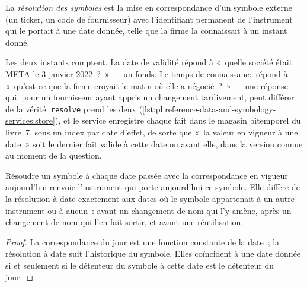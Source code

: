 \begin{definition}\label{def:pl:reference-data-and-symbology-services:resolution}
La \emph{résolution des symboles} est la mise en correspondance d'un symbole externe (un ticker, un code de fournisseur) avec l'identifiant
permanent de l'instrument qui le portait à une date donnée, telle que la firme la connaissait à un instant donné.
\end{definition}

Les deux instants comptent. La date de validité répond à «~quelle société était META le 3 janvier 2022~?~» --- un fonds. Le temps de connaissance répond à
«~qu'est-ce que la firme croyait le matin où elle a négocié~?~» --- une réponse qui, pour un fournisseur ayant appris un changement tardivement, peut différer de la
vérité. \texttt{resolve} prend les deux (\cref{lst:pl:reference-data-and-symbology-services:store}), et le service enregistre chaque fait
dans le magasin bitemporel du livre~7, sous un index par date d'effet, de sorte que «~la valeur en vigueur à une date~» soit le dernier fait valide
à cette date ou avant elle, dans la version connue au moment de la question.

\label{lst:pl:reference-data-and-symbology-services:store}

\begin{proposition}\label{prop:pl:reference-data-and-symbology-services:today}
Résoudre un symbole à chaque date passée avec la correspondance en vigueur aujourd'hui renvoie l'instrument qui porte aujourd'hui ce symbole. Elle
diffère de la résolution à date exactement aux dates où le symbole appartenait à un autre instrument ou à aucun~: avant un
changement de nom qui l'y amène, après un changement de nom qui l'en fait sortir, et avant une réutilisation.
\end{proposition}

\begin{proof}
La correspondance du jour est une fonction constante de la date~; la résolution à date suit l'historique du symbole. Elles coïncident à une date donnée
si et seulement si le détenteur du symbole à cette date est le détenteur du jour.
\end{proof}

